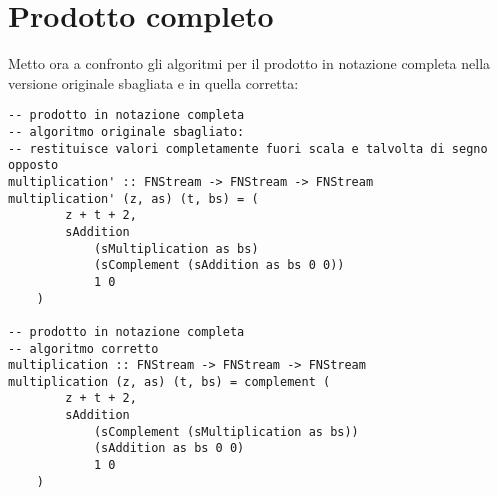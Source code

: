 \documentclass[Lau]{sapthesis}
\begin{document}
\section{Prodotto completo}
Metto ora a confronto gli algoritmi per il prodotto in notazione completa nella versione originale sbagliata e in quella corretta:
\begin{verbatim}
-- prodotto in notazione completa
-- algoritmo originale sbagliato:
-- restituisce valori completamente fuori scala e talvolta di segno opposto
multiplication' :: FNStream -> FNStream -> FNStream
multiplication' (z, as) (t, bs) = (
        z + t + 2,
        sAddition
            (sMultiplication as bs)
            (sComplement (sAddition as bs 0 0))
            1 0
    )

-- prodotto in notazione completa
-- algoritmo corretto
multiplication :: FNStream -> FNStream -> FNStream
multiplication (z, as) (t, bs) = complement (
        z + t + 2,
        sAddition
            (sComplement (sMultiplication as bs))
            (sAddition as bs 0 0)
            1 0
    )
\end{verbatim}
\end{document}
